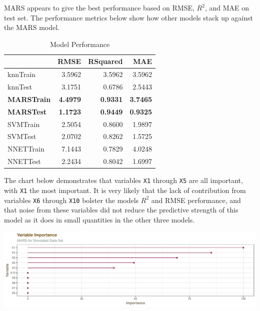 \documentclass[]{report}
\begin{document}
MARS appears to give the best performance based on RMSE, \(R^2\), and
MAE on test set. The performance metrics below show how other models
stack up against the MARS model.

\begin{table}[H]

\caption{\label{tab:unnamed-chunk-1}Model Performance}
\centering
\fontsize{8}{10}\selectfont
\begin{tabular}[t]{l|r|r|r}
\hline
\textbf{ } & \textbf{RMSE} & \textbf{RSquared} & \textbf{MAE}\\
\hline
\rowcolor{gray!6}  knnTrain & 3.5962 & 3.5962 & 3.5962\\
\hline
knnTest & 3.1751 & 0.6786 & 2.5443\\
\hline
\rowcolor{gray!6}  \rowcolor[HTML]{d9f2e6}  \textbf{MARSTrain} & \textbf{4.4979} & \textbf{0.9331} & \textbf{3.7465}\\
\hline
\rowcolor[HTML]{d9f2e6}  \textbf{MARSTest} & \textbf{1.1723} & \textbf{0.9449} & \textbf{0.9325}\\
\hline
\rowcolor{gray!6}  SVMTrain & 2.5054 & 0.8600 & 1.9897\\
\hline
SVMTest & 2.0702 & 0.8262 & 1.5725\\
\hline
\rowcolor{gray!6}  NNETTrain & 7.1443 & 0.7829 & 4.0248\\
\hline
NNETTest & 2.2434 & 0.8042 & 1.6997\\
\hline
\end{tabular}
\end{table}

The chart below demonstrates that variables \texttt{X1} through
\texttt{X5} are all important, with \texttt{X1} the most important. It
is very likely that the lack of contribution from variables \texttt{X6}
through \texttt{X10} bolster the models \(R^2\) and RMSE performance,
and that noise from these variables did not reduce the predictive
strength of this model as it does in small quantities in the other three
models.

\includegraphics{Homework-Two2_files/figure-latex/kj-7.2-4b-1.pdf}
\end{document}

